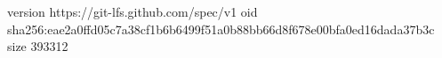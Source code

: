 version https://git-lfs.github.com/spec/v1
oid sha256:eae2a0ffd05c7a38cf1b6b6499f51a0b88bb66d8f678e00bfa0ed16dada37b3c
size 393312
